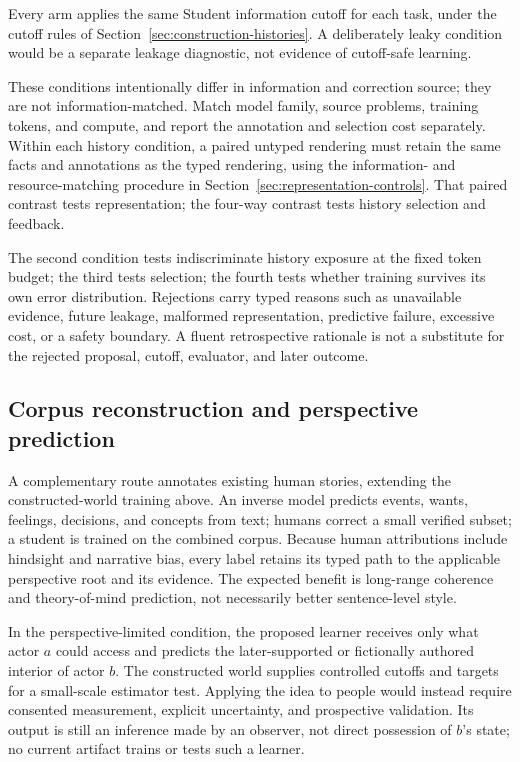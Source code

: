 \documentclass[10pt]{article}
\begin{document}
Every arm applies the same Student information cutoff for each task, under the
cutoff rules of Section~\ref{sec:construction-histories}.
A deliberately leaky condition would be a separate leakage diagnostic,
not evidence of cutoff-safe learning.

These conditions intentionally differ in information and correction source;
they are not information-matched. Match model family, source problems, training
tokens, and compute, and report the annotation and selection cost separately.
Within each history condition, a paired untyped rendering must retain the
same facts and annotations as the typed rendering, using the information-
and resource-matching procedure in Section~\ref{sec:representation-controls}.
That paired contrast tests representation; the four-way contrast tests
history selection and feedback.

The second condition tests indiscriminate history exposure at the fixed token
budget; the third tests
selection; the fourth tests whether training survives its
own error distribution. Rejections carry typed reasons such as unavailable
evidence, future leakage, malformed representation, predictive failure,
excessive cost, or a safety boundary. A fluent retrospective rationale is not
a substitute for the rejected proposal, cutoff, evaluator, and later outcome.

\subsection{Corpus reconstruction and perspective prediction}
\label{sec:corpus-interior-learning}

A complementary route annotates existing human stories, extending the
constructed-world training above. An inverse model
predicts events, wants, feelings, decisions, and concepts from text; humans
correct a small verified subset; a student is trained on the combined corpus.
Because human attributions include hindsight and narrative bias, every label
retains its typed path to the applicable perspective root and its evidence. The expected benefit is long-range
coherence and theory-of-mind prediction, not necessarily better sentence-level
style.

In the perspective-limited condition, the proposed learner receives only what
actor $a$ could access and
predicts the later-supported or fictionally authored interior of actor $b$.
The constructed world supplies controlled cutoffs and targets for a small-scale
estimator test. Applying the idea to people would instead require consented
measurement, explicit uncertainty, and prospective validation. Its output is
still an inference made by an observer, not direct possession of $b$'s state;
no current artifact trains or tests such a learner.
\end{document}
